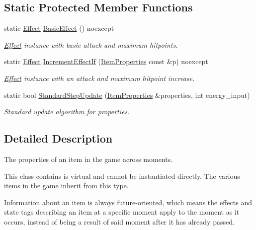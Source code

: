 \subsection*{Static Protected Member Functions}
\begin{DoxyCompactItemize}
\item 
static \hyperlink{classitem_1_1_effect}{Effect} \hyperlink{classitem_1_1_item_a69a02566ccfd21e054e48864a9d4362e}{Basic\+Effect} () noexcept
\begin{DoxyCompactList}\small\item\em {\ttfamily \hyperlink{classitem_1_1_effect}{Effect}} instance with basic attack and maximum hitpoints. \end{DoxyCompactList}\item 
static \hyperlink{classitem_1_1_effect}{Effect} \hyperlink{classitem_1_1_item_abaff3ea78fa8c9940868b99ce8b6d2ea}{Increment\+Effect\+If} (\hyperlink{classitem_1_1_item_properties}{Item\+Properties} const \&p) noexcept
\begin{DoxyCompactList}\small\item\em {\ttfamily \hyperlink{classitem_1_1_effect}{Effect}} instance with an attack and maximum hitpoint increase. \end{DoxyCompactList}\item 
static bool \hyperlink{classitem_1_1_item_a93ef8f291ecf2886ea6902d496624334}{Standard\+Step\+Update} (\hyperlink{classitem_1_1_item_properties}{Item\+Properties} \&properties, int energy\+\_\+input)
\begin{DoxyCompactList}\small\item\em Standard update algorithm for properties. \end{DoxyCompactList}\end{DoxyCompactItemize}


\subsection{Detailed Description}
The properties of an item in the game across moments. 

This class contains is virtual and cannot be instantiated directly. The various items in the game inherit from this type.

Information about an item is always future-\/oriented, which means the effects and state tags describing an item at a specific moment apply to the moment as it occurs, instead of being a result of said moment after it has already passed. 

